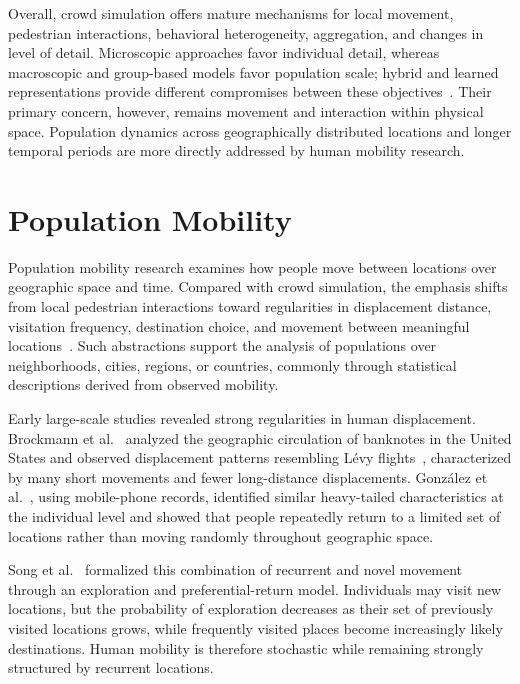 Overall, crowd simulation offers mature mechanisms for local movement, pedestrian interactions, behavioral heterogeneity, aggregation, and changes in level of detail. Microscopic approaches favor individual detail, whereas macroscopic and group-based models favor population scale; hybrid and learned representations provide different compromises between these objectives~\cite{ijaz2015hybridSurvey,antonitsch2019bioclouds,khan2024heterogeneousSurvey}. Their primary concern, however, remains movement and interaction within physical space. Population dynamics across geographically distributed locations and longer temporal periods are more directly addressed by human mobility research.

\section{Population Mobility}
\label{related:population_mobility}

Population mobility research examines how people move between locations over geographic space and time. Compared with crowd simulation, the emphasis shifts from local pedestrian interactions toward regularities in displacement distance, visitation frequency, destination choice, and movement between meaningful locations~\cite{brockmann2006scaling,gonzalez2008understanding,natureAlessandretti2017multiScaleSpatioTemporal}. Such abstractions support the analysis of populations over neighborhoods, cities, regions, or countries, commonly through statistical descriptions derived from observed mobility.

Early large-scale studies revealed strong regularities in human displacement. Brockmann et al.~\cite{brockmann2006scaling} analyzed the geographic circulation of banknotes in the United States and observed displacement patterns resembling L\'evy flights~\cite{levy_flight,chechkin2008levy}, characterized by many short movements and fewer long-distance displacements. Gonz\'alez et al.~\cite{gonzalez2008understanding}, using mobile-phone records, identified similar heavy-tailed characteristics at the individual level and showed that people repeatedly return to a limited set of locations rather than moving randomly throughout geographic space.

Song et al.~\cite{natureSong2010exploration} formalized this combination of recurrent and novel movement through an exploration and preferential-return model. Individuals may visit new locations, but the probability of exploration decreases as their set of previously visited locations grows, while frequently visited places become increasingly likely destinations. Human mobility is therefore stochastic while remaining strongly structured by recurrent locations.

